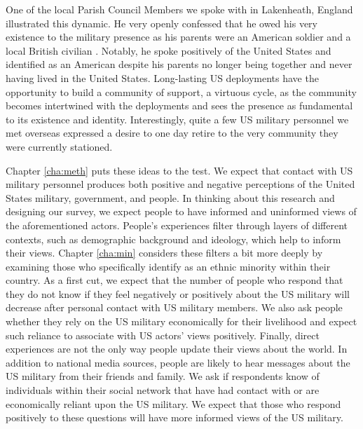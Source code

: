 One of the local Parish Council Members we spoke with in Lakenheath, England illustrated this dynamic. He very openly confessed that he owed his very existence to the military presence as his parents were an American soldier and a local British civilian \autocite{councilone20190718}. Notably, he spoke positively of the United States and identified as an American despite his parents no longer being together and never having lived in the United States. Long-lasting US deployments have the opportunity to build a community of support, a virtuous cycle, as the community becomes intertwined with the deployments and sees the presence as fundamental to its existence and identity. Interestingly, quite a few US military personnel we met overseas expressed a desire to one day retire to the very community they were currently stationed. %

Chapter \ref{cha:meth} puts these ideas to the test. We expect that contact with US military personnel produces both positive and negative perceptions of the United States military, government, and people. In thinking about this research and designing our survey, we expect people to have informed and uninformed views of the aforementioned actors. People's experiences filter through layers of different contexts, such as demographic background and ideology, which help to inform their views. Chapter \ref{cha:min} considers these filters a bit more deeply by examining those who specifically identify as an ethnic minority within their country. As a first cut, we expect that the number of people who respond that they do not know if they feel negatively or positively about the US military will decrease after personal contact with US military members. We also ask people whether they rely on the US military economically for their livelihood and expect such reliance to associate with US actors' views positively. Finally, direct experiences are not the only way people update their views about the world. In addition to national media sources, people are likely to hear messages about the US military from their friends and family. We ask if respondents know of individuals within their social network that have had contact with or are economically reliant upon the US military. We expect that those who respond positively to these questions will have more informed views of the US military. 

